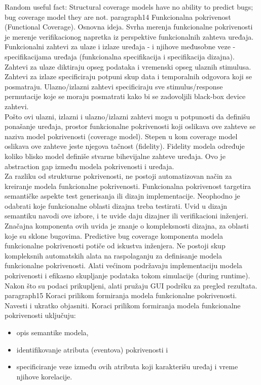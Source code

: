 \indent *Random useful fact: Structural coverage models have no ability to predict bugs; bug coverage model they are not.
paragraph{14 Funkcionalna pokrivenost (Functional Coverage). Osnovna ideja.}
\indent Svrha merenja funkcionalne pokrivenosti je merenje verifikacionog napretka iz perspektive funkcionalnih zahteva uređaja. Funkcionalni zahtevi za ulaze i izlaze uređaja - i njihove međusobne veze - specifikacijama uređaja (funkcionalna specifikacija i specifikacija dizajna). Zahtevi za ulaze diktiraju opseg podataka i vremenski opseg ulaznih stimulusa. Zahtevi za izlaze specificiraju potpuni skup data i temporalnih odgovora koji se posmatraju. Ulazno/izlazni zahtevi specificiraju sve stimulus/response permutacije koje se moraju posmatrati kako bi se zadovoljili black-box device zahtevi.\\
\indent Pošto ovi ulazni, izlazni i ulazno/izlazni zahtevi mogu u potpunosti da definišu ponašanje uređaja, prostor funkcionalne pokrivenosti koji oslikava ove zahteve se naziva model pokrivenosti (coverage model). Stepen u kom coverage model oslikava ove zahteve jeste njegova tačnost (fidelity). Fidelity modela određuje koliko blisko model definiše stvarne bihevijalne zahteve uređaja. Ovo je abstraction gap između modela pokrivenosti i uređaja.\\
\indent Za razliku od strukturne pokrivenosti, ne postoji automatizovan način za kreiranje modela funkcionalne pokrivenosti. Funkcionalna pokrivenost targetira semantičke aspekte test generisanja ili dizajn implementacije. Neophodno je odabrati koje funkcionalne oblasti dizajna treba testirati. Uvid u dizajn semantiku navodi ove izbore, i te uvide daju dizajner ili verifikacioni inženjeri.\\
\indent Značajna komponenta ovih uvida je znanje o kompleksnosti dizajna, za oblasti koje su sklone bugovima. Predictive bug coverage komponenta modela funkcionalne pokrivenosti potiče od iskustva inženjera. Ne postoji skup kompleksnih automatskih alata na raspolaganju za definisanje modela funkcionalne pokrivenosti. Alati većinom podržavaju implementaciju modela pokrivenosti i efikasno skupljanje podataka tokom simulacije (during runtime). Nakon što su podaci prikupljeni, alati pružaju GUI podršku za pregled rezultata.
paragraph{15 Koraci prilikom formiranja modela funkcionalne pokrivenosti. Navesti i ukratko objasniti.}
\indent Koraci prilikom formiranja modela funkcionalne pokrivenosti uključuju:
\begin{itemize}
\item opis semantike modela,
\item identifikovanje atributa (eventova) pokrivenosti i
\item specificiranje veze između ovih atributa koji karakterišu uređaj i vreme njihove korelacije. 
\end{itemize}
